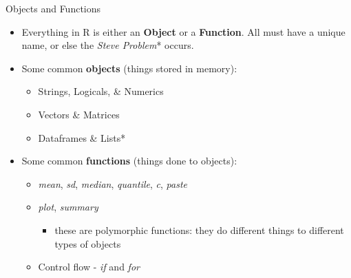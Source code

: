 \documentclass[
  ignorenonframetext,
  aspectratio=169]{beamer}
\providecommand{\tightlist}{%
  \setlength{\itemsep}{0pt}\setlength{\parskip}{0pt}}
\begin{document}
\begin{frame}{Objects and Functions}
\protect\hypertarget{objects-and-functions}{}
\begin{itemize}[<+->]
\tightlist
\item
  Everything in R is either an \textbf{Object} or a \textbf{Function}.
  All must have a unique name, or else the \emph{Steve Problem}* occurs.
\item
  Some common \textbf{objects} (things stored in memory):

  \begin{itemize}[<+->]
  \tightlist
  \item
    Strings, Logicals, \& Numerics
  \item
    Vectors \& Matrices
  \item
    Dataframes \& Lists*
  \end{itemize}
\item
  Some common \textbf{functions} (things done to objects):

  \begin{itemize}[<+->]
  \tightlist
  \item
    \emph{mean}, \emph{sd}, \emph{median}, \emph{quantile}, \emph{c},
    \emph{paste}
  \item
    \emph{plot}, \emph{summary}

    \begin{itemize}[<+->]
    \tightlist
    \item
      these are polymorphic functions: they do different things to
      different types of objects
    \end{itemize}
  \item
    Control flow - \emph{if} and \emph{for}
  \end{itemize}
\end{itemize}
\end{frame}
\end{document}
